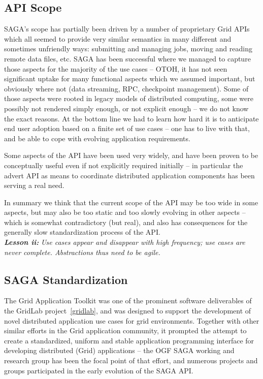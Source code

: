 \documentclass[]{article}
\newcommand{\I}[1]{\textit{#1}}
\newcommand{\BI}[1]{\textbf{\textit{#1}}}
\begin{document}
 \subsection{API Scope}

  SAGA's scope has partially been driven by a number of proprietary
  Grid APIs which all seemed to provide very similar semantics in many
  different and sometimes unfriendly ways: submitting and managing
  jobs, moving and reading remote data files, etc.  SAGA has been
  successful where we managed to capture those aspects for the
  majority of the use cases -- OTOH, it has not seen significant
  uptake for many functional aspects which we assumed important, but
  obviously where not (data streaming, RPC, checkpoint management).
  Some of those aspects were rooted in legacy models of distributed
  computing, some were possibly not rendered simply enough, or not
  explicit enough -- we do not know the exact reasons.  At the bottom
  line we had to learn how hard it is to anticipate end user adoption
  based on a finite set of use cases -- one has to live with that, and
  be able to cope with evolving application requirements.

  Some aspects of the API have been used very widely, and have been
  proven to be conceptually useful even if not explicitly required
  initially -- in particular the advert API as means to coordinate
  distributed application components has been serving a real need.

  In summary we think that the current scope of the API may be too
  wide in some aspects, but may also be too static and too slowly
  evolving in other aspects -- which is somewhat contradictory (but
  real), and also has consequences for the generally slow
  standardization process of the API.\\
  \BI{Lesson ii:} \I{Use cases appear and disappear with high frequency;
  use cases are never complete.  Abstractions thus need to be agile.}


 \subsection{SAGA Standardization}

  The Grid Application Toolkit was one of the prominent software
  deliverables of the GridLab project~\ref{gridlab}, and was designed
  to support the development of novel distributed application use
  cases for grid environments.  Together with other similar efforts in
  the Grid application community, it prompted the attempt to create
  a standardized, uniform and stable application programming interface
  for developing distributed (Grid) applications -- the OGF SAGA
  working and research group has been the focal point of that effort,
  and numerous projects and groups participated in the early
  evolution of the SAGA API.  
\end{document}
